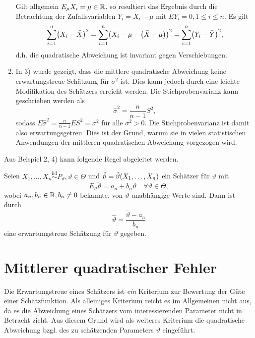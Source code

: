 \documentclass{lecture}
\begin{document}
\begin{example}
\begin{enumerate}
            Gilt allgemein \(E_\mu X_i = \mu \in \mathbb{R}\), so resultiert das Ergebnis durch die Betrachtung der Zufallsvariablen \(Y_i = X_i - \mu\) mit \(EY_i = 0, 1 \le i \le n\).
            Es gilt
            \[
                \sum_{i = 1}^n \parentheses*{X_i - \bar{X}}^2 = \sum_{i = 1}^n \parentheses*{X_i - \mu - \parentheses*{\bar{X} - \mu}}^2 = \sum_{i = 1}^n \parentheses*{Y_i - \bar{Y}}^2,
            \]
            d.h. die quadratische Abweichung ist invariant gegen Verschiebungen.
            \item In 3) wurde gezeigt, dass die mittlere quadratische Abweichung keine erwartungstreue Schätzung für \(\sigma^2\) ist.
            Dies kann jedoch durch eine leichte Modifikation des Schätzers erreicht werden.
            Die Stichprobenvarianz kann geschrieben werden als
            \[
                \hat{\sigma}^2 = \frac{n}{n - 1}S^2,
            \]
            sodass \(E\hat{\sigma}^2 = \frac{n}{n - 1}ES^2 = \sigma^2\) für alle \(\sigma^2 > 0\).
            Die Stichprobenvarianz ist damit also erwartungsgetreu.
            Dies ist der Grund, warum sie in vielen statistischen Anwendungen der mittleren quadratischen Abweichung vorgezogen wird.
        \end{enumerate}
    \end{example}

    Aus Beispiel 2, 4) kann folgende Regel abgeleitet werden.

    \begin{theorem}
        Seien \(X_1, \ldots, X_n \stackrel{\text{iid}}{\sim} P_\vartheta, \vartheta \in \Theta\) und \(\tilde{\vartheta} = \tilde{\vartheta}\parentheses*{X_1, \ldots, X_n}\) ein Schätzer für \(\vartheta\) mit
        \[
            E_\vartheta \tilde{\vartheta} = a_n + b_n\vartheta \quad \forall \vartheta \in \Theta,
        \]
        wobei \(a_n, b_n \in \mathbb{R}, b_n \ne 0\) bekannte, von \(\vartheta\) unabhängige Werte sind.
        Dann ist durch
        \[
            \hat{\vartheta} = \frac{\tilde{\vartheta} - a_n}{b_n}
        \]
        eine erwartungstreue Schätzung für \(\vartheta\) gegeben.
    \end{theorem}


    \section*{Mittlerer quadratischer Fehler}

    Die Erwartungstreue eines Schätzers ist \emph{ein} Kriterium zur Bewertung der Güte einer Schätzfunktion.
    Als alleiniges Kriterium reicht es im Allgemeinen nicht aus, da es die Abweichung eines Schätzers vom interessierenden Parameter nicht in Betracht zieht.
    Aus diesem Grund wird als weiteres Kriterium die quadratische Abweichung bzgl. des zu schätzenden Parameters \(\vartheta\) eingeführt.
\end{document}
